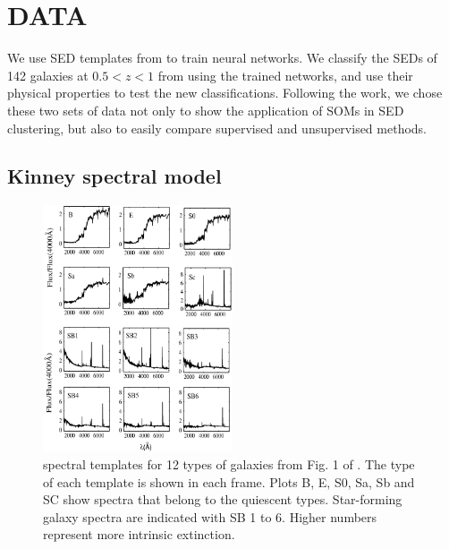 
\section{DATA}
\label{sec: data}
We use SED templates from  to train neural networks. %
We classify the SEDs of 142 galaxies at $0.5<z<1$ from  using the trained networks, and use their physical properties to test the new classifications.
Following the  work, we chose these two sets of data not only to show the application of SOMs in SED clustering, but also to easily compare supervised and unsupervised methods.
 
 \subsection{Kinney spectral model}
     \begin{figure}
        \centering
        \includegraphics[width=0.5\textwidth]{images/k96.jpg}
        \caption{ spectral templates for 12 types of galaxies from Fig. 1 of . The type of each template is shown in each frame. Plots B, E, S0, Sa, Sb and SC show spectra that belong to the quiescent types. Star-forming galaxy spectra are indicated with SB 1 to 6. Higher numbers represent more intrinsic extinction.}
        \label{fig: k96}
    \end{figure}
      
